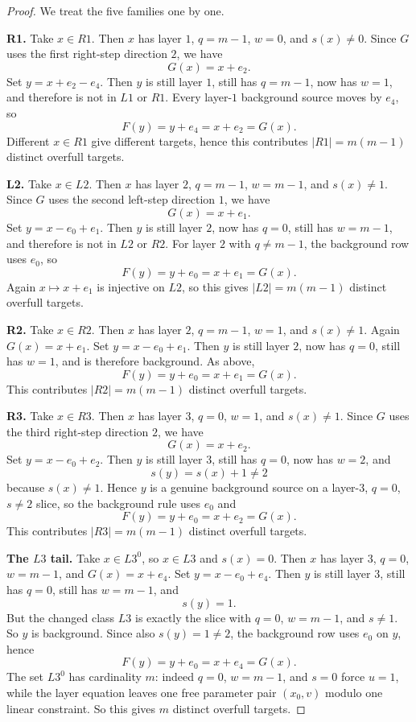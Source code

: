 \documentclass[11pt]{article}
\newcommand{\eX}{e_0}
\newcommand{\eQ}{e_1}
\newcommand{\eW}{e_2}
\newcommand{\eU}{e_4}
\begin{document}
\begin{proof}
We treat the five families one by one.

\smallskip
\noindent\textbf{R1.}
Take $x\in R1$.
Then $x$ has layer $1$, $q=m-1$, $w=0$, and $s(x)\neq 0$.
Since $G$ uses the first right-step direction $2$, we have
\[
G(x)=x+\eW.
\]
Set $y=x+\eW-\eU$.
Then $y$ is still layer $1$, still has $q=m-1$, now has $w=1$, and therefore is
not in $L1$ or $R1$.
Every layer-$1$ background source moves by $\eU$, so
\[
F(y)=y+\eU=x+\eW=G(x).
\]
Different $x\in R1$ give different targets, hence this contributes $|R1|=m(m-1)$
distinct overfull targets.

\smallskip
\noindent\textbf{L2.}
Take $x\in L2$.
Then $x$ has layer $2$, $q=m-1$, $w=m-1$, and $s(x)\neq 1$.
Since $G$ uses the second left-step direction $1$, we have
\[
G(x)=x+\eQ.
\]
Set $y=x-\eX+\eQ$.
Then $y$ is still layer $2$, now has $q=0$, still has $w=m-1$, and therefore is
not in $L2$ or $R2$.
For layer $2$ with $q\neq m-1$, the background row uses $\eX$, so
\[
F(y)=y+\eX=x+\eQ=G(x).
\]
Again $x\mapsto x+\eQ$ is injective on $L2$, so this gives $|L2|=m(m-1)$
distinct overfull targets.

\smallskip
\noindent\textbf{R2.}
Take $x\in R2$.
Then $x$ has layer $2$, $q=m-1$, $w=1$, and $s(x)\neq 1$.
Again $G(x)=x+\eQ$.
Set $y=x-\eX+\eQ$.
Then $y$ is still layer $2$, now has $q=0$, still has $w=1$, and is therefore
background.
As above,
\[
F(y)=y+\eX=x+\eQ=G(x).
\]
This contributes $|R2|=m(m-1)$ distinct overfull targets.

\smallskip
\noindent\textbf{R3.}
Take $x\in R3$.
Then $x$ has layer $3$, $q=0$, $w=1$, and $s(x)\neq 1$.
Since $G$ uses the third right-step direction $2$, we have
\[
G(x)=x+\eW.
\]
Set $y=x-\eX+\eW$.
Then $y$ is still layer $3$, still has $q=0$, now has $w=2$, and
\[
s(y)=s(x)+1\neq 2
\]
because $s(x)\neq 1$.
Hence $y$ is a genuine background source on a layer-$3$, $q=0$, $s\neq 2$ slice,
so the background rule uses $\eX$ and
\[
F(y)=y+\eX=x+\eW=G(x).
\]
This contributes $|R3|=m(m-1)$ distinct overfull targets.

\smallskip
\noindent\textbf{The $L3$ tail.}
Take $x\in L3^0$, so $x\in L3$ and $s(x)=0$.
Then $x$ has layer $3$, $q=0$, $w=m-1$, and $G(x)=x+\eU$.
Set $y=x-\eX+\eU$.
Then $y$ is still layer $3$, still has $q=0$, still has $w=m-1$, and
\[
s(y)=1.
\]
But the changed class $L3$ is exactly the slice with $q=0$, $w=m-1$, and
$s\neq 1$.
So $y$ is background.
Since also $s(y)=1\neq 2$, the background row uses $\eX$ on $y$, hence
\[
F(y)=y+\eX=x+\eU=G(x).
\]
The set $L3^0$ has cardinality $m$: indeed $q=0$, $w=m-1$, and $s=0$ force $u=1$,
while the layer equation leaves one free parameter pair $(x_0,v)$ modulo one linear
constraint.
So this gives $m$ distinct overfull targets.


\end{proof}
\end{document}
